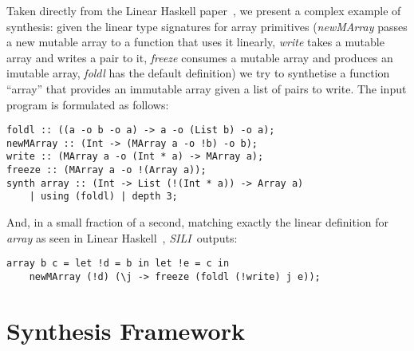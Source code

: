 \documentclass{llncs}
\newcommand{\synname}{\emph{SILI}}
\begin{document}
Taken directly from the Linear Haskell paper~\cite{Bernardy_2018}, we present a
complex example of synthesis: given the linear type signatures for array
primitives (\emph{newMArray} passes a new mutable array to a function that uses
it linearly, \emph{write} takes a mutable array and writes a pair to it,
\emph{freeze} consumes a mutable array and produces an imutable array,
\emph{foldl} has the default definition) we try to synthetise a function
``array'' that provides an immutable array given a list of pairs to write. The input program is formulated as
follows:
%
\begin{verbatim}
foldl :: ((a -o b -o a) -> a -o (List b) -o a);
newMArray :: (Int -> (MArray a -o !b) -o b);
write :: (MArray a -o (Int * a) -> MArray a);
freeze :: (MArray a -o !(Array a));
synth array :: (Int -> List (!(Int * a)) -> Array a)
    | using (foldl) | depth 3;
\end{verbatim}
%
And, in a small fraction of a second, matching exactly the linear definition for
\emph{array} as seen in Linear Haskell~\cite{Bernardy_2018}, \synname\ outputs:
%
\begin{verbatim}
array b c = let !d = b in let !e = c in
    newMArray (!d) (\j -> freeze (foldl (!write) j e));
\end{verbatim}

\section{Synthesis Framework}\label{sec:formal_system}


\end{document}
